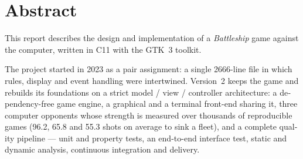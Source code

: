 \chapter*{Abstract}

\begin{otherlanguage}{english}
    This report describes the design and implementation of a \emph{Battleship} game against the
    computer, written in C11 with the GTK~3 toolkit.

    The project started in 2023 as a pair assignment: a single \num{2666}-line file in which
    rules, display and event handling were intertwined. Version~2 keeps the game and rebuilds its
    foundations on a strict model / view / controller architecture: a dependency-free game engine,
    a graphical and a terminal front-end sharing it, three computer opponents whose strength is
    measured over thousands of reproducible games (\num{96.2}, \num{65.8} and \num{55.3} shots on
    average to sink a fleet), and a complete quality pipeline --- unit and property tests, an
    end-to-end interface test, static and dynamic analysis, continuous integration and delivery.
\end{otherlanguage}
